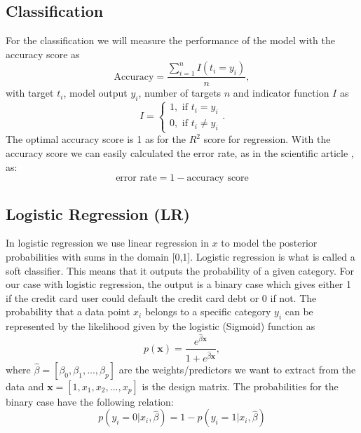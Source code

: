 \documentclass[12pt,a4paper,english]{article}
\begin{document}
\subsection{Classification}
\label{subsect:Classification}
For the classification we will measure the performance of the model with the accuracy score as
\begin{equation}
\label{eq:accuracy_score}
\text{Accuracy}=\frac{\sum_{i=1}^{n}I(t_i=y_i)}{n},
\end{equation}
with target $t_i$, model output $y_i$, number of targets $n$ and indicator function $I$ as
\[I=\begin{cases}
1, \text{ if } t_i=y_i\\
0, \text{ if } t_i\neq y_i
\end{cases}.\]
The optimal accuracy score is 1 as for the $R^2$ score for regression. With the accuracy score we can easily calculated the error rate, as in the scientific article \cite{origarticle}, as:
\begin{equation}
\label{eq:error_rate}
\text{error rate}=1-\text{accuracy score}
\end{equation}

\subsection{Logistic Regression (LR)}
\label{subsect:LR}
In logistic regression we use linear regression in $x$ to model the posterior probabilities with sums in the domain [0,1]. Logistic regression is what is called a soft classifier. This means that it outputs the probability of a given category. For our case with logistic regression, the output is a binary case which gives either 1 if the credit card user could default the credit card debt or 0 if not. The probability that a data point $x_i$ belongs to a specific category $y_i$ can be represented by the likelihood given by the logistic (Sigmoid) function as
\begin{equation}
\label{eq:sigmoid}
p(\textbf{x})=\frac{e^{\hat{\beta}\textbf{x}}}{1+e^{\hat{\beta}\textbf{x}}},
\end{equation}
where $\hat{\beta}=[\beta_0,\beta_1,...,\beta_p]$ are the weights/predictors we want to extract from the data and $\textbf{x}=[1,x_1,x_2,...,x_p]$ is the design matrix. The probabilities for the binary case have the following relation:
\begin{equation*}
p(y_i=0|x_i,\hat{\beta})=1-p(y_i=1|x_i,\hat{\beta})
\end{equation*}
\end{document}
